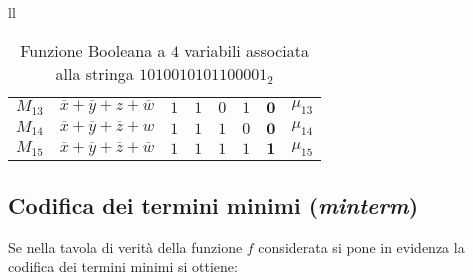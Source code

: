 \documentclass[a4paper]{extarticle}
\begin{document}
\begin{table}[H]
\begin{tabularx}{\textwidth}{ll}
{\begin{tabular}{c|c||cccc||c|c}
          $M_{13}$ & $\overline{x} + \overline{y} + z + \overline{w}$ & $1$ & $1$ & $0$ & $1$ & $\boldsymbol{0}$ & $\mu_{13}$\\
          $M_{14}$ & $\overline{x} + \overline{y} + \overline{z} + w$ & $1$ & $1$ & $1$ & $0$ & $\boldsymbol{0}$ & $\mu_{14}$\\
          $M_{15}$ & $\overline{x} + \overline{y} + \overline{z} + \overline{w}$ & $1$ & $1$ & $1$ & $1$ & $\boldsymbol{1}$ & $\mu_{15}$\\
        \end{tabular}
    }
  \end{tabularx}
  \caption{Funzione Booleana a $4$ variabili associata alla stringa $1010010101100001_2$}
  \label{tab:funzione_booleana_associata_stringa}
\end{table}

\subsection{Codifica dei termini minimi (\emph{minterm})}
\label{sec:codifica_minterm}
Se nella tavola di verità della funzione $f$ considerata si pone in evidenza la codifica dei termini minimi si ottiene:
\end{document}
